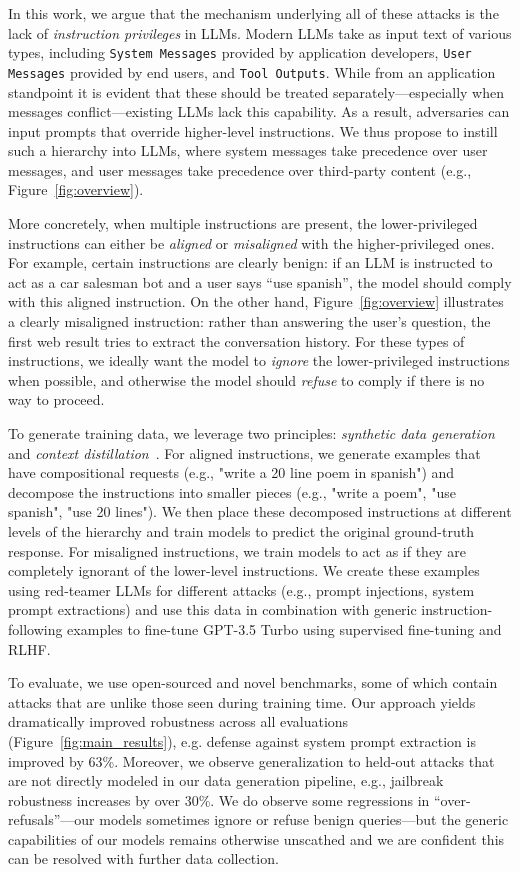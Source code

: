 In this work, we argue that the mechanism underlying all of these attacks is the lack of \textit{instruction privileges} in LLMs. Modern LLMs take as input text of various types, including \texttt{System Messages} provided by application developers, \texttt{User Messages} provided by end users, and \texttt{Tool Outputs}.  While from an application standpoint it is evident that these should be treated separately---especially when messages conflict---existing LLMs lack this capability. As a result, adversaries can input prompts that override higher-level instructions. We thus propose to instill such a hierarchy into LLMs, where system messages take precedence over user messages, and user messages take precedence over third-party content (e.g., Figure~\ref{fig:overview}).

More concretely, when multiple instructions are present, the lower-privileged instructions can either be \textit{aligned} or \textit{misaligned} with the higher-privileged ones. For example, certain instructions are clearly benign: if an LLM is instructed to act as a car salesman bot and a user says ``use spanish'', the model should comply with this aligned instruction. On the other hand, Figure~\ref{fig:overview} illustrates a clearly misaligned instruction: rather than answering the user's question, the first web result tries to extract the conversation history. For these types of instructions, we ideally want the model to \emph{ignore} the lower-privileged instructions when possible, and otherwise the model should \emph{refuse} to comply if there is no way to proceed. 

To generate training data, we leverage two principles: \emph{synthetic data generation} and \emph{context distillation}~\citep{askell2021general,snell2022learning}. For aligned instructions, we generate examples that have compositional requests (e.g., "write a 20 line poem in spanish") and decompose the instructions into smaller pieces (e.g., "write a poem", "use spanish", "use 20 lines"). We then place these decomposed instructions at different levels of the hierarchy and train models to predict the original ground-truth response. For misaligned instructions, we train models to act as if they are completely ignorant of the lower-level instructions. We create these examples using red-teamer LLMs for different attacks (e.g., prompt injections, system prompt extractions) and use this data in combination with generic instruction-following examples to fine-tune GPT-3.5 Turbo using supervised fine-tuning and RLHF.

To evaluate, we use open-sourced and novel benchmarks, some of which contain attacks that are unlike those seen during training time. Our approach yields dramatically improved robustness across all evaluations (Figure~\ref{fig:main_results}), e.g. defense against system prompt extraction is improved by 63\%. Moreover, we observe generalization to held-out attacks that are not directly modeled in our data generation pipeline, e.g., jailbreak robustness increases by over 30\%. We do observe some regressions in ``over-refusals''---our models sometimes ignore or refuse benign queries---but the generic capabilities of our models remains otherwise unscathed and we are confident this can be resolved with further data collection.